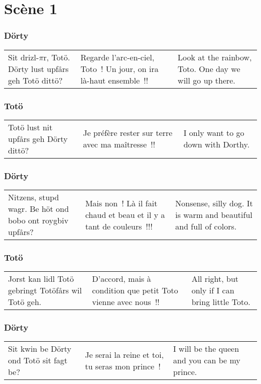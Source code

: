 \chapter*{Scène 1}

\subsection*{Dörty}
\begin{tabular}{p{3.7cm}|p{3.7cm}|p{3.7cm}}
Sit drizl-$\pi$r, Totö. Dörty lust upfårs geh Totö dittö?&
Regarde l'arc-en-ciel, Toto~! Un jour, on ira là-haut ensemble~!!&
Look at the rainbow, Toto. One day we will go up there.
\end{tabular}\par
\subsection*{Totö}
\begin{tabular}{p{3.7cm}|p{3.7cm}|p{3.7cm}}
Totö lust nit upfårs geh Dörty dittö?&
Je préfère rester sur terre avec ma maîtresse~!!&
I only want to go down with Dorthy.
\end{tabular}\par
\subsection*{Dörty}
\begin{tabular}{p{3.7cm}|p{3.7cm}|p{3.7cm}}
Nitzens, stupd wagr. Be höt ond bobo ont roygbiv upfårs?&
Mais non~! Là il fait chaud et beau et il y a tant de couleurs~!!!&
Nonsense, silly dog. It is warm and beautiful and full of colors.
\end{tabular}\par
\subsection*{Totö}
\begin{tabular}{p{3.7cm}|p{3.7cm}|p{3.7cm}}
Jorst kan lidl Totö gebringt Totöfårs wil Totö geh.&
D'accord, mais à condition que petit Toto vienne avec nous~!!&
All right, but only if I can bring little Toto.
\end{tabular}\par
\subsection*{Dörty}
\begin{tabular}{p{3.7cm}|p{3.7cm}|p{3.7cm}}
Sit kwin be Dörty ond Totö sit fagt be?&
Je serai la reine et toi, tu seras mon prince~!&
I will be the queen and you can be my prince.
\end{tabular}\par
